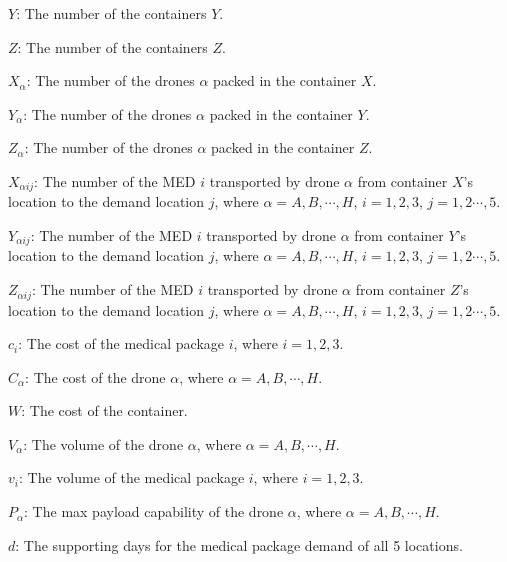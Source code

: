 \documentclass{mcmthesis}
\begin{document}
\noindent $Y$: The number of the containers $Y$.

\noindent $Z$: The number of the containers $Z$.

\noindent $X_\alpha$: The number of the drones $\alpha$ packed in the container $X$.

\noindent $Y_\alpha$: The number of the drones $\alpha$ packed in the container $Y$.

\noindent $Z_\alpha$: The number of the drones $\alpha$ packed in the container $Z$.

\noindent $X_{\alpha ij}$: The number of the MED $i$ transported by drone $\alpha$ from container $X$'s location to the demand location $j$, where $\alpha=A,B,\cdots,H$, $i=1,2,3$, $j=1,2\cdots,5$.

\noindent $Y_{\alpha ij}$: The number of the MED $i$ transported by drone $\alpha$ from container $Y$'s location to the demand location $j$, where $\alpha=A,B,\cdots,H$, $i=1,2,3$, $j=1,2\cdots,5$.

\noindent $Z_{\alpha ij}$: The number of the MED $i$ transported by drone $\alpha$ from container $Z$'s location to the demand location $j$, where $\alpha=A,B,\cdots,H$, $i=1,2,3$, $j=1,2\cdots,5$.

\noindent $c_i$: The cost of the medical package $i$, where $i=1,2,3$.

\noindent $C_\alpha$: The cost of the drone $\alpha$, where $\alpha=A,B,\cdots,H$.

\noindent $W$: The cost of the container.

\noindent $V_\alpha$: The volume of the drone $\alpha$, where $\alpha=A,B,\cdots,H$.

\noindent $v_i$: The volume of the medical package $i$, where $i=1,2,3$.

\noindent $P_\alpha$: The max payload capability of the drone $\alpha$, where $\alpha=A,B,\cdots,H$.

\noindent $d$: The supporting days for the medical package demand of all 5 locations.
\end{document}
